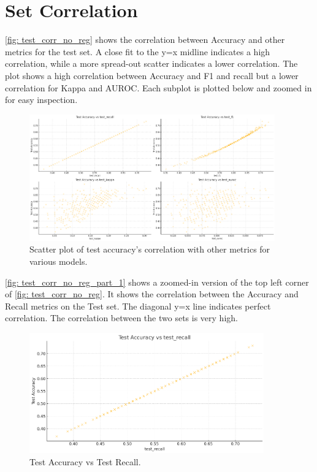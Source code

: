\section{Set Correlation}

\autoref{fig: test_corr_no_reg} shows the correlation between Accuracy and other metrics for the test set. A close fit to the y=x midline indicates a high correlation, while a more spread-out scatter indicates a lower correlation. The plot shows a high correlation between Accuracy and F1 and recall but a lower correlation for Kappa and AUROC. Each subplot is plotted below and zoomed in for easy inspection.
\begin{figure}[H]
    \centering
    \includegraphics[width=400px]{Figures/results/acc_corr_no_reg.png}
    \caption{Scatter plot of test accuracy's correlation with other metrics for various models.}
    \label{fig: test_corr_no_reg}
\end{figure}

\autoref{fig: test_corr_no_reg_part_1} shows a zoomed-in version of the top left corner of \autoref{fig: test_corr_no_reg}. It shows the correlation between the Accuracy and Recall metrics on the Test set. The diagonal y=x line indicates perfect correlation. The correlation between the two sets is very high.
\begin{figure}[H]
    \centering
    \includegraphics[width=0.9\textwidth]{Figures/results/acc_corr_no_reg_part_1.png}
    \caption{Test Accuracy vs Test Recall.}
    \label{fig: test_corr_no_reg_part_1}
\end{figure}

